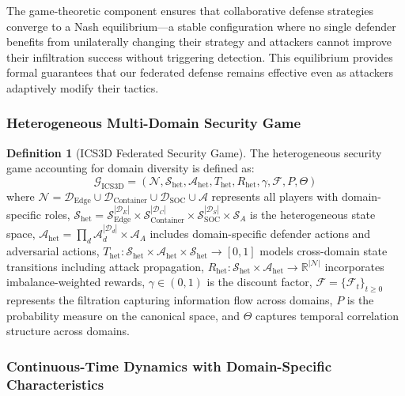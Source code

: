 \documentclass[12pt,a4paper]{article}
\theoremstyle{definition}
\newtheorem{definition}[theorem]{Definition}
\newcommand{\R}{\mathbb{R}}
\newcommand{\D}{\mathcal{D}}
\newcommand{\A}{\mathcal{A}}
\newcommand{\N}{\mathcal{N}}
\renewcommand{\S}{\mathcal{S}}
\newcommand{\G}{\mathcal{G}}
\newcommand{\F}{\mathcal{F}}
\begin{document}
The game-theoretic component ensures that collaborative defense strategies converge to a Nash equilibrium—a stable configuration where no single defender benefits from unilaterally changing their strategy and attackers cannot improve their infiltration success without triggering detection. This equilibrium provides formal guarantees that our federated defense remains effective even as attackers adaptively modify their tactics.

\subsubsection{Heterogeneous Multi-Domain Security Game}

\begin{definition}[ICS3D Federated Security Game]
\label{def:federated_game}
The heterogeneous security game accounting for domain diversity is defined as:
\begin{equation}
\G_{\text{ICS3D}} = (\N, \S_{\text{het}}, \A_{\text{het}}, T_{\text{het}}, R_{\text{het}}, \gamma, \F, P, \Theta)
\end{equation}
where $\N = \D_{\text{Edge}} \cup \D_{\text{Container}} \cup \D_{\text{SOC}} \cup \A$ represents all players with domain-specific roles, $\S_{\text{het}} = \S_{\text{Edge}}^{|\D_E|} \times \S_{\text{Container}}^{|\D_C|} \times \S_{\text{SOC}}^{|\D_S|} \times \S_A$ is the heterogeneous state space, $\A_{\text{het}} = \prod_{d} \A_d^{|\D_d|} \times \A_A$ includes domain-specific defender actions and adversarial actions, $T_{\text{het}}: \S_{\text{het}} \times \A_{\text{het}} \times \S_{\text{het}} \rightarrow [0,1]$ models cross-domain state transitions including attack propagation, $R_{\text{het}}: \S_{\text{het}} \times \A_{\text{het}} \rightarrow \R^{|\N|}$ incorporates imbalance-weighted rewards, $\gamma \in (0,1)$ is the discount factor, $\F = \{\F_t\}_{t \geq 0}$ represents the filtration capturing information flow across domains, $P$ is the probability measure on the canonical space, and $\Theta$ captures temporal correlation structure across domains.
\end{definition}

\subsubsection{Continuous-Time Dynamics with Domain-Specific Characteristics}
\end{document}

